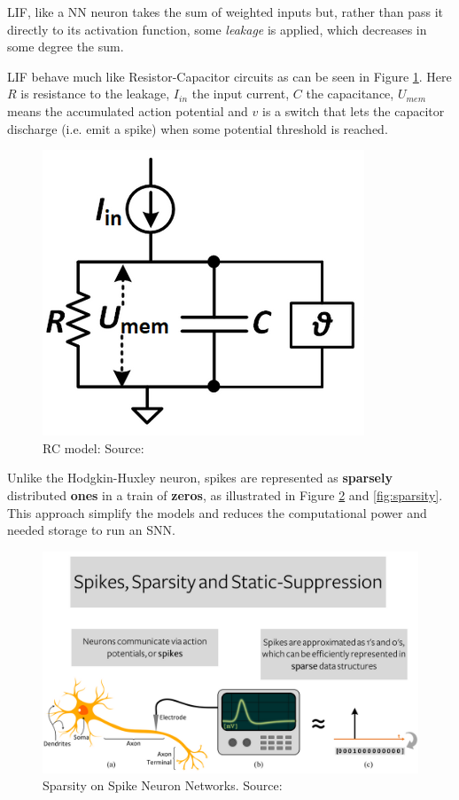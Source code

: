 			\par LIF, like a NN neuron takes the sum of weighted inputs but, rather than pass it directly to its activation function, some \textit{leakage} is applied, which decreases in some degree the sum. 
			\par LIF behave much like Resistor-Capacitor circuits as can be seen in Figure \ref{fig:rcmodel}. Here $R$ is resistance to the leakage, $I_{in}$ the input current, $C$ the capacitance, $U_{mem}$ means the accumulated action potential and $v$ is a switch that lets the capacitor discharge (i.e. emit a spike) when some potential threshold is reached.

			\begin{figure}[H]
				\centering
				\includegraphics[width=0.4\linewidth]{images/rcmodel}
				\caption[The RC model]{RC model: Source: \cite{10242251}}
				\label{fig:rcmodel}
			\end{figure}
			
			\par Unlike the Hodgkin-Huxley neuron, spikes are represented as \textbf{sparsely} distributed \textbf{ones} in a train of \textbf{zeros}, as illustrated in Figure \ref{fig:spikessparsitystaticsupress} and \ref{fig:sparsity}. This approach simplify the models and reduces the computational power and needed storage to run an SNN.\newline
			
			\begin{figure}[H]
				\centering
				\includegraphics[width=\linewidth]{images/spikesSparsityStaticSupress}
				\caption{Sparsity on Spike Neuron Networks. Source: \cite{10242251}}
				\label{fig:spikessparsitystaticsupress}
			\end{figure}

